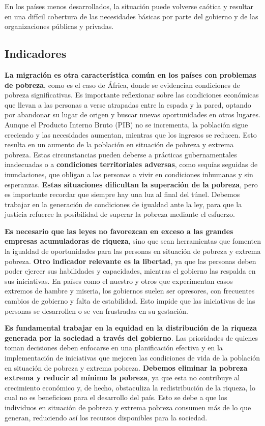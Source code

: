 \documentclass[
  jou,
  floatsintext,
  longtable,
  a4paper,
  nolmodern,
  notxfonts,
  notimes,
  12pt,
  colorlinks=true,linkcolor=blue,citecolor=blue,urlcolor=blue]{apa7}
\begin{document}
En los países menos desarrollados, la situación puede volverse caótica y
resultar en una difícil cobertura de las necesidades básicas por parte
del gobierno y de las organizaciones públicas y privadas.

\subsection{Indicadores}\label{indicadores}

\textbf{La migración es otra característica común en los países con
problemas de pobreza}, como es el caso de África, donde se evidencian
condiciones de pobreza significativas. Es importante reflexionar sobre
las condiciones económicas que llevan a las personas a verse atrapadas
entre la espada y la pared, optando por abandonar su lugar de origen y
buscar nuevas oportunidades en otros lugares. Aunque el Producto Interno
Bruto (PIB) no se incrementa, la población sigue creciendo y las
necesidades aumentan, mientras que los ingresos se reducen. Esto resulta
en un aumento de la población en situación de pobreza y extrema pobreza.
Estas circunstancias pueden deberse a prácticas gubernamentales
inadecuadas o a \textbf{condiciones territoriales adversas}, como
sequías seguidas de inundaciones, que obligan a las personas a vivir en
condiciones inhumanas y sin esperanzas. \textbf{Estas situaciones
dificultan la superación de la pobreza}, pero es importante recordar que
siempre hay una luz al final del túnel. Debemos trabajar en la
generación de condiciones de igualdad ante la ley, para que la justicia
refuerce la posibilidad de superar la pobreza mediante el esfuerzo.

\textbf{Es necesario que las leyes no favorezcan en exceso a las grandes
empresas acumuladoras de riqueza}, sino que sean herramientas que
fomenten la igualdad de oportunidades para las personas en situación de
pobreza y extrema pobreza. \textbf{Otro indicador relevante es la
libertad}, ya que las personas deben poder ejercer sus habilidades y
capacidades, mientras el gobierno las respalda en sus iniciativas. En
países como el nuestro y otros que experimentan casos extremos de hambre
y miseria, los gobiernos suelen ser opresores, con frecuentes cambios de
gobierno y falta de estabilidad. Esto impide que las iniciativas de las
personas se desarrollen o se ven frustradas en su gestación.

\textbf{Es fundamental trabajar en la equidad en la distribución de la
riqueza generada por la sociedad a través del gobierno}. Las prioridades
de quienes toman decisiones deben enfocarse en una planificación
efectiva y en la implementación de iniciativas que mejoren las
condiciones de vida de la población en situación de pobreza y extrema
pobreza. \textbf{Debemos eliminar la pobreza extrema y reducir al mínimo
la pobreza}, ya que esta no contribuye al crecimiento económico y, de
hecho, obstaculiza la redistribución de la riqueza, lo cual no es
beneficioso para el desarrollo del país. Esto se debe a que los
individuos en situación de pobreza y extrema pobreza consumen más de lo
que generan, reduciendo así los recursos disponibles para la sociedad.
\end{document}

